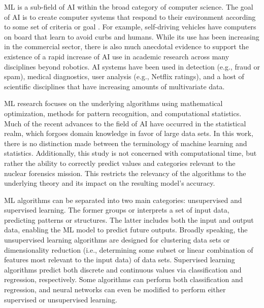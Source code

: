 \Gls{ML} is a sub-field of \gls{AI} within the broad category of
computer science. The goal of \gls{AI} is to create computer systems that
respond to their environment according to some set of criteria or goal
\cite{changingml}.  For example, self-driving vehicles have computers on board
that learn to avoid curbs and humans. While its use has been increasing in the
commercial sector, there is also much anecdotal evidence to support the
existence of a rapid increase of \gls{AI} use in academic research across many
disciplines beyond robotics. \gls{AI} systems have been used in detection
(e.g., fraud or spam), medical diagnostics, user analysis (e.g., Netflix
ratings), and a host of scientific disciplines that have increasing amounts of
multivariate data.

\gls{ML} research focuses on the underlying algorithms using mathematical
optimization, methods for pattern recognition, and computational statistics.
Much of the recent advances to the field of \gls{AI} have occurred in the
statistical realm, which forgoes domain knowledge in favor of large data sets.
In this work, there is no distinction made between the terminology of machine
learning and statistics.  Additionally, this study is not concerned with
computational time, but rather the ability to correctly predict values and
categories relevant to the nuclear forensics mission. This restricts the
relevancy of the algorithms to the underlying theory and its impact on the
resulting model's accuracy. 

\gls{ML} algorithms can be separated into two main categories: unsupervised and
supervised learning.  The former groups or interprets a set of input data,
predicting patterns or structures. The latter includes both the input and
output data, enabling the \gls{ML} model to predict future outputs.  Broadly
speaking, the unsupervised learning algorithms are designed for clustering data
sets or dimensionality reduction (i.e., determining some subset or linear
combination of features most relevant to the input data) of data sets.
Supervised learning algorithms predict both discrete and continuous values via
classification and regression, respectively. Some algorithms can perform both
classification and regression, and neural networks can even be modified to
perform either supervised or unsupervised learning.\cite{elements_stats} 

